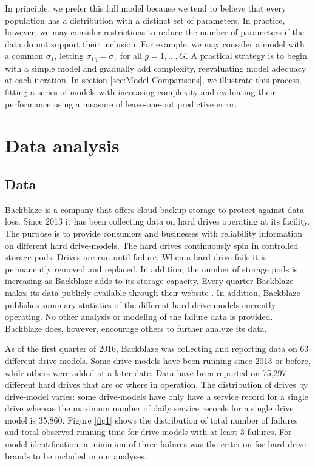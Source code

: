 \documentclass[12pt]{article}
\begin{document}
In principle, we prefer this full model because we tend to believe that every population has a distribution with a distinct set of parameters. In practice, however, we may consider restrictions to reduce the number of parameters if the data do not support their inclusion. For example, we may consider a model with a common $\sigma_{1}$, letting $\sigma_{1g}=\sigma_1$ for all $g=1,\ldots,G$. A practical strategy is to begin with a simple model and gradually add complexity, reevaluating model adequacy at each iteration. In section \ref{sec:Model Comparisons}, we illustrate this process, fitting a series of models with increasing complexity and evaluating their performance using a measure of leave-one-out predictive error.


\section{Data analysis}
\label{sec:Data analysis}
\subsection{Data}
\label{sec:Data}
Backblaze is a company that offers cloud backup storage to protect against data loss.  Since 2013 it has been collecting data on hard drives operating at its facility.  The purpose is to provide consumers and businesses with reliability information on different hard drive-models.  The hard drives continuously spin in controlled storage pods.  Drives are run until failure.  When a hard drive fails it is permanently removed and replaced.  In addition, the number of storage pods is increasing as Backblaze adds to its storage capacity.  Every quarter Backblaze makes its data publicly available through their website \cite{backblaze}. In addition, Backblaze publishes summary statistics of the different hard drive-models currently operating.  No other analysis or modeling of the failure data is provided.  Backblaze does, however, encourage others to further analyze its data. 

As of the first quarter of 2016, Backblaze was collecting and reporting data on 63 different drive-models.  Some drive-models have been running since 2013 or before, while others were added at a later date.  Data have been reported on 75,297 different hard drives that are or where in operation.  The distribution of drives by drive-model varies: some drive-models have only have a service record for a single drive whereas the maximum number of daily service records for a single drive model is 35,860.  Figure \ref{fig1} shows the distribution of total number of failures and total observed running time for drive-models with at least 3 failures.  For model identification, a minimum of three failures was the criterion for hard drive brands to be included in our analyses.  
\end{document}
